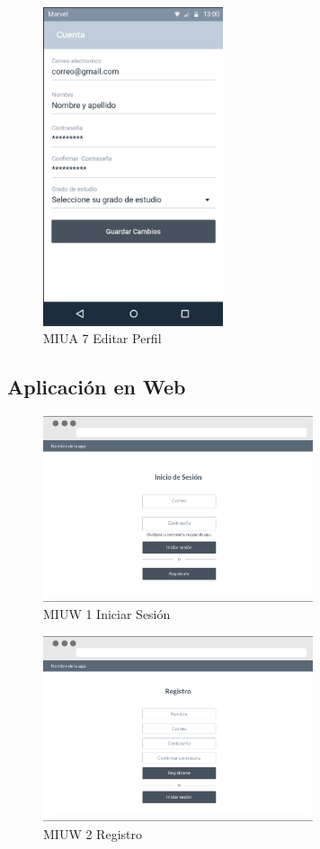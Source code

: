 \begin{figure}[H]
    \centering
    \includegraphics[width=200px]{capitulo4/imagenes/android/MIUA_7.png}
    \caption{MIUA 7 Editar Perfil}
    \label{fig:MIUA-7} %
\end{figure}

\newpage
\subsection{Aplicación en Web}
\begin{figure}[H]
    \centering
    \includegraphics[width=300px]{capitulo4/imagenes/web/IUW_1.png}
    \caption{MIUW 1 Iniciar Sesión}
    \label{fig:MIUW-1}
\end{figure}

\begin{figure}[H]
    \centering
    \includegraphics[width=300px]{capitulo4/imagenes/web/IUW_2.png}
    \caption{MIUW 2 Registro}
    \label{fig:MIUW-2}
\end{figure}

